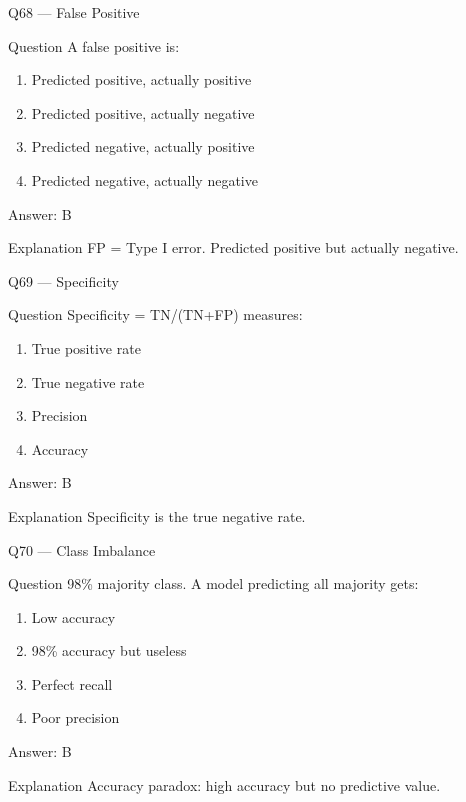 \documentclass[aspectratio=169,8pt]{beamer}
\begin{document}
	\begin{frame}{Q68 --- False Positive}
		\begin{block}{Question}
			A false positive is:
		\end{block}
		\begin{enumerate}
			\item Predicted positive, actually positive
			\item Predicted positive, actually negative
			\item Predicted negative, actually positive
			\item Predicted negative, actually negative
		\end{enumerate}
		\begin{exampleblock}{Answer: B}\end{exampleblock}
		\begin{block}{Explanation}
			FP = Type I error. Predicted positive but actually negative.
		\end{block}
	\end{frame}
	
	\begin{frame}{Q69 --- Specificity}
		\begin{block}{Question}
			Specificity = TN/(TN+FP) measures:
		\end{block}
		\begin{enumerate}
			\item True positive rate
			\item True negative rate
			\item Precision
			\item Accuracy
		\end{enumerate}
		\begin{exampleblock}{Answer: B}\end{exampleblock}
		\begin{block}{Explanation}
			Specificity is the true negative rate.
		\end{block}
	\end{frame}
	
	\begin{frame}{Q70 --- Class Imbalance}
		\begin{block}{Question}
			98\% majority class. A model predicting all majority gets:
		\end{block}
		\begin{enumerate}
			\item Low accuracy
			\item 98\% accuracy but useless
			\item Perfect recall
			\item Poor precision
		\end{enumerate}
		\begin{exampleblock}{Answer: B}\end{exampleblock}
		\begin{block}{Explanation}
			Accuracy paradox: high accuracy but no predictive value.
		\end{block}
	\end{frame}
	
\end{document}

